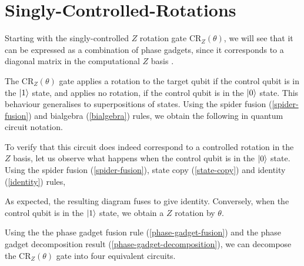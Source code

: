\section{Singly-Controlled-Rotations}

Starting with the singly-controlled $Z$ rotation gate CR$_Z(\theta)$, we will see that it can be expressed as a combination of phase gadgets, since it corresponds to a diagonal matrix in the computational $Z$ basis \cite{Yeung2020}.


The CR$_Z(\theta)$ gate applies a rotation to the target qubit if the control qubit is in the $\ket 1$ state, and applies no rotation, if the control qubit is in the $\ket 0$ state. This behaviour generalises to superpositions of states. Using the spider fusion (\ref{spider-fusion}) and bialgebra (\ref{bialgebra}) rules, we obtain the following in quantum circuit notation.


To verify that this circuit does indeed correspond to a controlled rotation in the $Z$ basis, let us observe what happens when the control qubit is in the $\ket 0$ state. Using the spider fusion (\ref{spider-fusion}), state copy (\ref{state-copy}) and identity (\ref{identity}) rules,


As expected, the resulting diagram fuses to give identity. Conversely, when the control qubit is in the $\ket 1$ state, we obtain a $Z$ rotation by $\theta$.


Using the the phase gadget fusion rule (\ref{phase-gadget-fusion}) and the phase gadget decomposition result (\ref{phase-gadget-decomposition}), we can decompose the CR$_Z(\theta)$ gate into four equivalent circuits.

